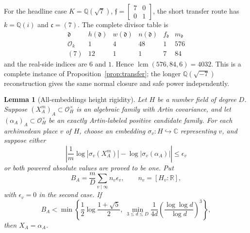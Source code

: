 \documentclass[11pt]{article}
\newtheorem{lemma}[theorem]{Lemma}
\newcommand{\Q}{\mathbb Q}
\begin{document}
For the headline case \(K=\Q(\sqrt7)\),
\(\mathfrak f=\left[\begin{smallmatrix}7&0\\0&1\end{smallmatrix}\right]\),
the short transfer route has \(k=\Q(i)\) and
\(\mathfrak c=(7)\).  The complete divisor table is
\begin{equation}\label{eq:q7-divisor-table}
\begin{array}{c|r|r|r|r|r}
\mathfrak d&h(\mathfrak d)&w(\mathfrak d)&n(\mathfrak d)
 &f_{\mathfrak d}&m_{\mathfrak d}\\ \hline
\mathcal O_k&1&4&48&1&576\\
(7)&12&1&1&7&84
\end{array}
\end{equation}
and the real-side indices are \(6\) and \(1\).  Hence
\(\operatorname{lcm}(576,84,6)=4032\).  This is a complete instance
of Proposition~\ref{prop:transfer}; the longer
\(\Q(\sqrt{-7})\) reconstruction gives the same normal closure and
safe power independently.

\begin{lemma}[All-embeddings height rigidity]\label{lem:height}
Let \(H\) be a number field of degree \(D\).  Suppose
\((X_A^m)_A\subset\mathcal O_H^\times\) is an algebraic family with
Artin covariance, and let
\((\alpha_A)_A\subset\mathcal O_H^\times\) be an exactly
Artin-labeled positive candidate family.  For each archimedean place
\(v\) of \(H\), choose an embedding
\(\sigma_v:H\hookrightarrow\mathbb C\) representing \(v\), and
suppose either
\begin{equation}\label{eq:height-comparison}
 \left|
 \frac1m\log|\sigma_v(X_A^m)|
 -\log|\sigma_v(\alpha_A)|
 \right|\le\epsilon_v
\end{equation}
or both powered absolute values are proved to be one.  Put
\begin{equation}\label{eq:height-upper}
 B_A=\frac{m}{D}\sum_{v\mid\infty}n_v\epsilon_v,
\qquad n_v=[H_v:\mathbb R],
\end{equation}
with \(\epsilon_v=0\) in the second case.  If
\begin{equation}\label{eq:voutier-gate}
 B_A<
 \min\left\{\frac12\log\frac{1+\sqrt5}{2},\
 \min_{3\le d\le D}
 \frac1{4d}\left(\frac{\log\log d}{\log d}\right)^3
 \right\},
\end{equation}
then \(X_A=\alpha_A\).
\end{lemma}
\end{document}
